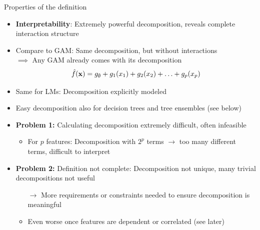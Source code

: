 \documentclass[10pt,compress,t,notes=noshow, xcolor=table]{beamer}
\begin{document}

\begin{frame}{Properties of the definition}
\begin{itemize}
    \item \textbf{Interpretability}: Extremely powerful decomposition, reveals complete interaction structure
    \pause
    \item Compare to GAM: Same decomposition, but without interactions \\
    $\implies$ Any GAM already comes with its decomposition
    $$
    \hat{f} (\mathbf{x}) = g_\emptyset + g_1(x_1) + g_2(x_2) + \ldots + g_p(x_p)
    $$
    \item Same for LMs: Decomposition explicitly modeled
    \pause
    \item Easy decomposition also for decision trees and tree ensembles (see below)
    \pause
    \item \textbf{Problem 1:} Calculating decomposition extremely difficult, often infeasible
    \begin{itemize}
        \item For \(p\) features: Decomposition with \(2^p\) terms \(\rightarrow\) too many different terms, difficult to interpret
    \end{itemize}
    \pause
    \item \textbf{Problem 2:} Definition not complete: Decomposition not unique, many trivial decompositions not useful
    \begin{itemize}
        \item[$\rightarrow$] More requirements or constraints needed to ensure decomposition is meaningful
        \item Even worse once features are dependent or correlated (see later)
    \end{itemize}


\end{itemize}
\end{frame}
\end{document}
